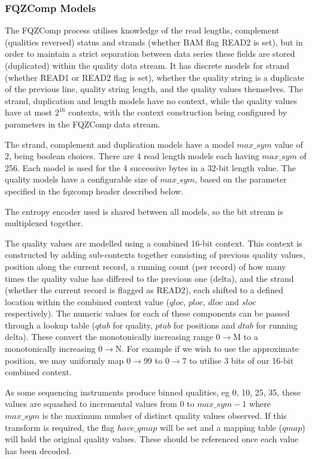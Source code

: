 \documentclass[a4paper]{article}
\begin{document}
\subsubsection*{FQZComp Models}

The FQZComp process utilises knowledge of the read lengths, complement
(qualities reversed) status and strands (whether BAM flag READ2 is
set), but in order to maintain a strict separation between data series
these fields are stored (duplicated) within the quality data stream.
It has discrete models for strand (whether READ1 or READ2 flag is
set), whether the quality string is a duplicate of the previous line,
quality string length, and the quality values themselves.  The strand,
duplication and length models have no context, while the quality
values have at most $2^{16}$ contexts, with the context construction
being configured by parameters in the FQZComp data stream.

The strand, complement and duplication models have a model $max\_sym$ value
of 2, being boolean choices.  There are 4 read length models each
having $max\_sym$ of 256.  Each model is used for the 4 successive
bytes in a 32-bit length value.  The quality models have a
configurable size of $max\_sym$, based on the parameter specified in
the fqzcomp header described below.

The entropy encoder used is shared between all models, so the bit
stream is multiplexed together.

The quality values are modelled using a combined 16-bit context.  This
context is constructed by adding sub-contexts together consisting of
previous quality values, position along the current record, a running
count (per record) of how many times the quality value has differed to
the previous one (delta), and the strand (whether the current record
is flagged as READ2), each shifted to a defined location within the
combined context value ($qloc$, $ploc$, $dloc$ and $sloc$
respectively).  The numeric values for each of these components can be
passed through a lookup table ($qtab$ for quality, $ptab$ for
positions and $dtab$ for running delta).  These convert the
monotonically increasing range 0$\rightarrow$M to a monotonically
increasing 0$\rightarrow$N.  For example if we wish to use the
approximate position, we may uniformly map 0$\rightarrow$99 to
0$\rightarrow$7 to utilise 3 bits of our 16-bit combined context.

As some sequencing instruments produce binned qualities, eg 0, 10, 25,
35, these values are squashed to incremental values from 0 to
$max\_sym-1$ where $max\_sym$ is the maximum number of distinct
quality values observed.  If this transform is required, the flag
$have\_qmap$ will be set and a mapping table ($qmap$) will hold the
original quality values.  These should be referenced once each value
has been decoded.
\end{document}
